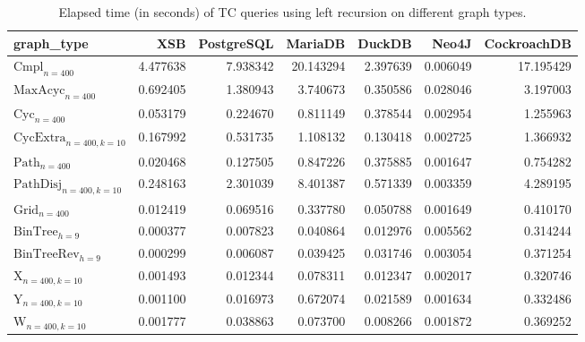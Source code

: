 \begin{table}
\caption{Elapsed time (in seconds) of TC queries using left recursion on different graph types.}
\label{table:left_recursion_real_time}
\begin{tabular}{lrrrrrr}
\toprule
graph\_type & XSB & PostgreSQL & MariaDB & DuckDB & Neo4J & CockroachDB \\
\midrule
$\text{Cmpl}_{n=400}$ & 4.477638 & 7.938342 & 20.143294 & 2.397639 & 0.006049 & 17.195429 \\
$\text{MaxAcyc}_{n=400}$ & 0.692405 & 1.380943 & 3.740673 & 0.350586 & 0.028046 & 3.197003 \\
$\text{Cyc}_{n=400}$ & 0.053179 & 0.224670 & 0.811149 & 0.378544 & 0.002954 & 1.255963 \\
$\text{CycExtra}_{n=400,k=10}$ & 0.167992 & 0.531735 & 1.108132 & 0.130418 & 0.002725 & 1.366932 \\
$\text{Path}_{n=400}$ & 0.020468 & 0.127505 & 0.847226 & 0.375885 & 0.001647 & 0.754282 \\
$\text{PathDisj}_{n=400,k=10}$ & 0.248163 & 2.301039 & 8.401387 & 0.571339 & 0.003359 & 4.289195 \\
$\text{Grid}_{n=400}$ & 0.012419 & 0.069516 & 0.337780 & 0.050788 & 0.001649 & 0.410170 \\
$\text{BinTree}_{h=9}$ & 0.000377 & 0.007823 & 0.040864 & 0.012976 & 0.005562 & 0.314244 \\
$\text{BinTreeRev}_{h=9}$ & 0.000299 & 0.006087 & 0.039425 & 0.031746 & 0.003054 & 0.371254 \\
$\text{X}_{n=400, k=10}$ & 0.001493 & 0.012344 & 0.078311 & 0.012347 & 0.002017 & 0.320746 \\
$\text{Y}_{n=400,k=10}$ & 0.001100 & 0.016973 & 0.672074 & 0.021589 & 0.001634 & 0.332486 \\
$\text{W}_{n=400,k=10}$ & 0.001777 & 0.038863 & 0.073700 & 0.008266 & 0.001872 & 0.369252 \\
\bottomrule
\end{tabular}
\end{table}
